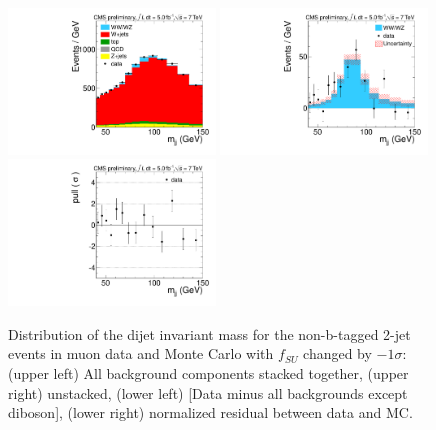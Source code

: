 \begin{figure}[h!]
  {\centering
    \includegraphics[width=0.49\textwidth]{figs/ScaleAndMatchingCrossChecks/mu2JNoBTag_fSUm1sigmafMUDef/Wjj_Diboson_Muon_2jets_Stacked.pdf}
    \includegraphics[width=0.49\textwidth]{figs/ScaleAndMatchingCrossChecks/mu2JNoBTag_fSUm1sigmafMUDef/Wjj_Diboson_Muon_2jets_Subtracted.pdf}
    \includegraphics[width=0.49\textwidth]{figs/ScaleAndMatchingCrossChecks/mu2JNoBTag_fSUm1sigmafMUDef/Wjj_Diboson_Muon_2jets_Pull.pdf}
    \caption{Distribution of the dijet invariant mass for the non-b-tagged 2-jet events in muon data and Monte Carlo with $f_{SU}$ changed by $-1\sigma$: 
      (upper left) All background components stacked together, 
      (upper right) unstacked, (lower left) [Data minus all backgrounds except diboson],  
      (lower right) normalized residual between data and MC. }
    \label{fig:fsufmuXcheck_fSUm1sigmafMUDef}}
\end{figure}
